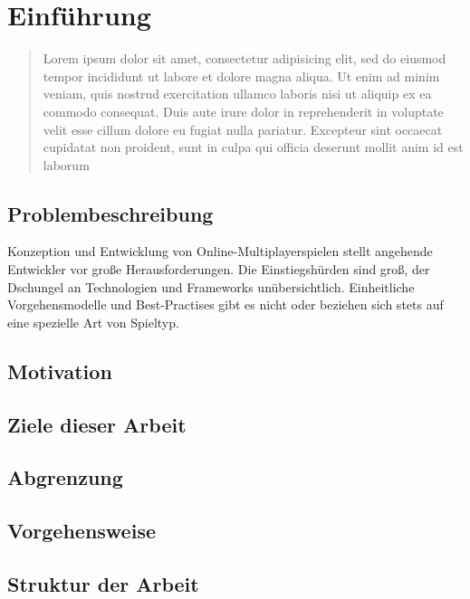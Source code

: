 \chapter{Einführung}
\begin{quote}
Lorem ipsum dolor sit amet, consectetur adipisicing elit, sed do eiusmod tempor incididunt ut labore et dolore magna aliqua. Ut enim ad minim veniam, quis nostrud exercitation ullamco laboris nisi ut aliquip ex ea commodo consequat. Duis aute irure dolor in reprehenderit in voluptate velit esse cillum dolore eu fugiat nulla pariatur. Excepteur sint occaecat cupidatat non proident, sunt in culpa qui officia deserunt mollit anim id est laborum \cite{lorem01} 
\end{quote} 

\cite{JoshAlman.2017}



\section{Problembeschreibung}

Konzeption und Entwicklung von Online-Multiplayerspielen stellt angehende Entwickler vor große Herausforderungen. Die Einstiegshürden sind groß, der Dschungel an Technologien und Frameworks unübersichtlich. Einheitliche Vorgehensmodelle und Best-Practises gibt es nicht oder beziehen sich stets auf eine spezielle Art von Spieltyp.

\section{Motivation}

\section{Ziele dieser Arbeit}

\section{Abgrenzung}

\section{Vorgehensweise}

\section{Struktur der Arbeit}
